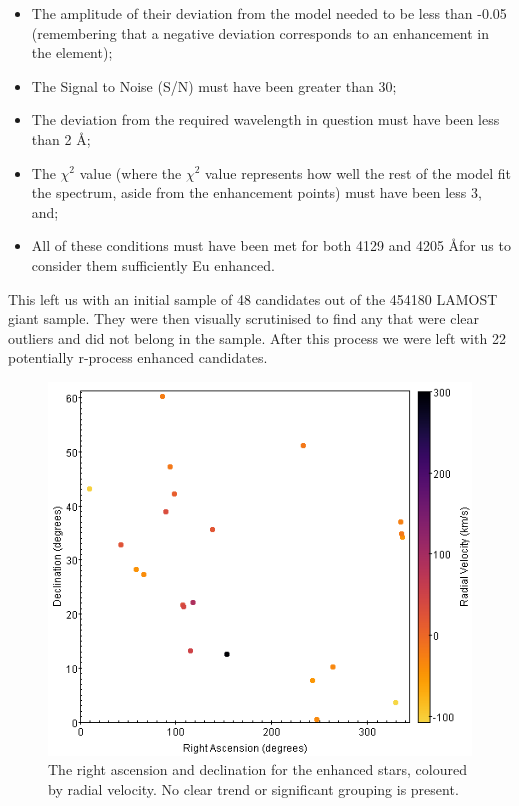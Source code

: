 \documentclass[a4paper,fleqn,usenatbib]{mnras}
\begin{document}
\begin{itemize}
	\item The amplitude of their deviation from the model needed to be less than -0.05 (remembering that a negative deviation corresponds to an enhancement in the element);
	\item The Signal to Noise (S/N) must have been greater than 30;
	\item The deviation from the required wavelength in question must have been less than 2 \AA;
	\item The $\chi^{2}$ value (where the $\chi^{2}$ value represents how well the rest of the model fit the spectrum, aside from the enhancement points) must have been less 3, and;
	\item All of these conditions must have been met for both 4129 and 4205 \AA for us to consider them sufficiently Eu enhanced.
\end{itemize}   

This left us with an initial sample of 48 candidates out of the 454180 LAMOST giant sample. They were then visually scrutinised to find any that were clear outliers and did not belong in the sample. After this process we were left with 22 potentially r-process enhanced candidates.




\begin{figure}
	\includegraphics[width=\columnwidth]{RA_v_dec_radial_velocity}
	\caption{The right ascension and declination for the enhanced stars, coloured by radial velocity. No clear trend or significant grouping is present.}
	\label{fig:radec_Eucands}
\end{figure}
\end{document}
